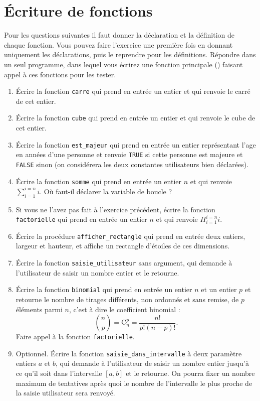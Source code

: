 \section{Écriture de fonctions}

Pour les questions suivantes il faut donner la déclaration et la
définition de chaque fonction. Vous pouvez faire l'exercice une
première fois en donnant uniquement les déclarations, puis le
reprendre pour les définitions. Répondre dans un seul programme, dans
lequel vous écrirez une fonction principale () faisant appel à
ces fonctions pour les tester.
\begin{enumerate}
\item Écrire la fonction \verb|carre| qui prend en entrée un entier et qui renvoie le carré de cet entier.
\item Écrire la fonction \verb|cube| qui prend en entrée un entier et qui renvoie le cube de cet entier.
\item Écrire la fonction \verb|est_majeur| qui prend en entrée un entier représentant l'age en années d'une personne et renvoie \verb|TRUE| si cette personne est majeure et \verb|FALSE| sinon (on considérera les deux constantes utilisateurs bien déclarées).
\item Écrire la fonction \verb|somme| qui prend en entrée un entier
  $n$ et qui renvoie $\sum_{i=1}^{i=n} i$. Où faut-il déclarer la
  variable de boucle ?
\item Si vous ne l'avez pas fait à l'exercice précédent, écrire la fonction \verb|factorielle| qui prend en entrée un entier
  $n$ et qui renvoie $\Pi_{i=1}^{i=n} i$. 
\item Écrire la procédure \verb|afficher_rectangle| qui prend en
  entrée deux entiers, largeur et hauteur, et affiche un rectangle
  d'étoiles de ces dimensions.
\item Écrire la fonction \verb|saisie_utilisateur| sans argument, qui demande à l'utilisateur de saisir un nombre entier et le
  retourne.
\item Écrire la fonction \verb|binomial| qui prend en entrée un entier
  $n$ et un entier $p$ et retourne le nombre de tirages différents,
  non ordonnés et sans remise, de $p$ éléments parmi $n$, c'est à dire
  le coefficient binomial :
\[
\binom{n}{p} = \text{C}^p_n = \frac{n!}{p!(n-p)!}.
\]
Faire appel à la fonction \verb|factorielle|.
\item Optionnel. Écrire la fonction \verb|saisie_dans_intervalle| à deux
  paramètre entiers $a$ et $b$, qui demande à l'utilisateur de saisir
  un nombre entier jusqu'à ce qu'il soit dans l'intervalle $[a, b]$ et le
  retourne. On pourra fixer un nombre maximum de tentatives après quoi
  le nombre de l'intervalle le plus proche de la saisie utilisateur
  sera renvoyé.
\end{enumerate}

